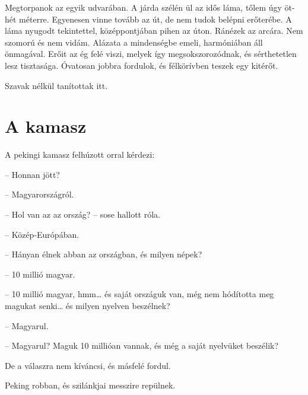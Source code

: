 Megtorpanok az egyik udvarában. A járda szélén ül az idős láma, tőlem
úgy öt-hét méterre. Egyenesen vinne tovább az út, de nem tudok
belépni erőterébe. A láma nyugodt tekintettel, középpontjában pihen
az úton. Ránézek az arcára. Nem szomorú és nem vidám. Alázata a
mindenségbe emeli, harmóniában áll önmagával. Erőit az ég felé viszi,
melyek így megsokszorozódnak, és sérthetetlen lesz tisztasága. Óvatosan
jobbra fordulok, és félkörívben teszek egy kitérőt.

Szavak nélkül tanítottak itt.

\section{A kamasz}

A pekingi kamasz felhúzott orral kérdezi:

-- Honnan jött?

-- Magyarországról.

-- Hol van az az ország? -- sose hallott róla.

-- Közép-Európában.

-- Hányan élnek abban az országban, és milyen népek?

-- 10 millió magyar.

-- 10 millió magyar, hmm\dots{} és saját országuk van, még nem hódította
meg magukat senki\dots{} és milyen nyelven beszélnek?

-- Magyarul.

-- Magyarul? Maguk 10 millióan vannak, és még a saját nyelvüket
beszélik?

De a válaszra nem kíváncsi, és másfelé fordul.

Peking robban, és szilánkjai messzire repülnek.
